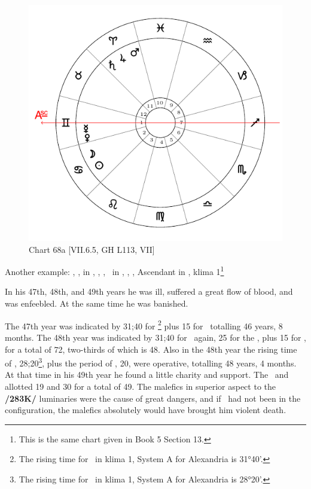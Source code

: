 \newpage
\begin{figure}
\centering
\vspace{0pt}
\includegraphics[width=.68\textwidth]{charts/5_10_13}
\caption{Chart 68a [VII.6.5, GH L113, VII]}
\label{fig:chart68a}
\end{figure} 

\noindent Another example: \Sun, \Moon, in \Cancer, \Saturn, \Jupiter, \Mars\, in \Aries, \Venus, \Mercury, Ascendant in \Gemini, klima 1\footnote{This is the same chart given in Book 5 Section 13.}

In his 47th, 48th, and 49th years he was ill, suffered a great flow of blood, and was enfeebled. At the same time he was banished. 

The 47th year was indicated by 31;40 for \Cancer\footnote{The rising time for \Cancer\, in klima 1, System A for Alexandria is 31°40'.} plus 15 for
\Mars\, totalling 46 years, 8 months. The 48th year was indicated by 31;40 for \Cancer\, again, 25 for the \Moon, plus 15 for \Mars, for a total of 72, two-thirds of which is 48. Also in the 48th year the rising time of \Gemini, 28;20\footnote{The rising time for \Gemini\, in klima 1, System A for Alexandria is 28°20'.}, plus the period of \Mercury, 20, were operative, totalling 48 years, 4 months. At that time in his 49th year he found a little charity and support. The \Sun\, and \Saturn\, allotted 19 and 30 for a total of 49. The malefics in superior aspect to the \textbf{/283K/} luminaries were the cause of great dangers, and if \Jupiter\, had not been in the configuration, the malefics absolutely would have brought him violent death. 


